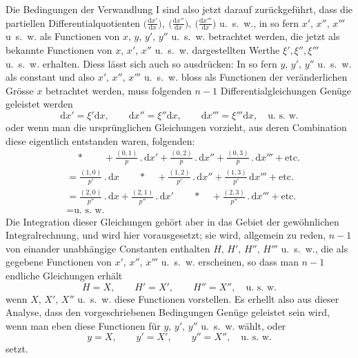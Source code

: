 Die Bedingungen der Verwandlung I sind also jetzt darauf zurückgeführt, dass die partiellen Differentialquotienten \(\bigl(\frac{\mathrm{d}x'}{\mathrm{d}x}\bigr),\ \bigl(\frac{\mathrm{d}x''}{\mathrm{d}x}\bigr),\ \bigl(\frac{\mathrm{d}x'''}{\mathrm{d}x}\bigr)\) u.\ s.\ w., in so fern \(x',\,x'',\,x'''\) u\ s.\ w. als Functionen von \(x,\,y,\,y',\,y''\) u.\ s.\ w. betrachtet werden, die jetzt als bekannte Functionen von \(x,\,x',\,x''\) u.\ s.\ w. dargestellten Werthe \(\xi',\xi'',\xi'''\) u.\ s.\ w. erhalten. Diess lässt sich auch so ausdrücken: In so fern \(y,\,y',\,y''\) u.\ s.\ w. als constant und also \(x',\,x'',\,x'''\) u.\ s.\ w. bloss als Functionen der veränderlichen Grösse \(x\) betrachtet werden, muss folgenden \(n-1\) Differentialgleichungen Genüge geleistet werden
\[
\mathrm{d}x'=\xi'\mathrm{d}x,\qquad
\mathrm{d}x''=\xi''\mathrm{d}x,\qquad
\mathrm{d}x'''=\xi'''\mathrm{d}x,\quad\text{u.\ s.\ w.}
\]
oder wenn man die ursprünglichen Gleichungen vorzieht, aus deren Combination diese eigentlich entstanden waren, folgenden:
\[
\begin{aligned}
&\quad *\qquad +\frac{(0,1)}{p}\mathbin{.}\mathrm{d}x'
 +\frac{(0,2)}{p}\mathbin{.}\mathrm{d}x''
 +\frac{(0,3)}{p}\mathbin{.}\mathrm{d}x'''+\text{etc.}\\
&=\frac{(1,0)}{p'}\mathbin{.}\mathrm{d}x\qquad *\quad
 +\frac{(1,2)}{p'}\mathbin{.}\mathrm{d}x''
 +\frac{(1,3)}{p'}\,\mathrm{d}x'''+\text{etc.}\\
&=\frac{(2,0)}{p''}\mathbin{.}\mathrm{d}x
 +\frac{(2,1)}{p''}\mathbin{.}\mathrm{d}x'\qquad *\quad
 +\frac{(2,3)}{p''}\mathbin{.}\mathrm{d}x'''+\text{etc.}\\
&=\text{u.\ s.\ w.}
\end{aligned}
\]
Die Integration dieser Gleichungen gehört aber in das Gebiet der gewöhnlichen Integralrechnung, und wird hier vorausgesetzt; sie wird, allgemein zu reden, \(n-1\) von einander unabhängige Constanten enthalten \(H,\,H',\,H'',\,H'''\) u.\ s.\ w., die als gegebene Functionen von \(x',\,x'',\,x'''\) u.\ s.\ w. erscheinen, so dass man \(n-1\) endliche Gleichungen erhält
\[
H=X,\qquad H'=X',\qquad H''=X'',\quad\text{u.\ s.\ w.}
\]
wenn \(X,\,X',\,X''\) u.\ s.\ w. diese Functionen vorstellen. Es erhellt also aus dieser Analyse, dass den vorgeschriebenen Bedingungen Genüge geleistet sein wird, wenn man eben diese Functionen für \(y,\,y',\,y''\) u.\ s.\ w. wählt, oder
\[
y=X,\qquad y'=X',\qquad y''=X'',\quad\text{u.\ s.\ w.}
\]
setzt.


